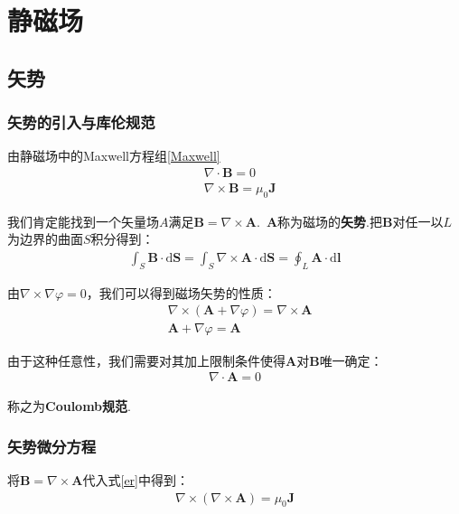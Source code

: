 \documentclass[main.tex]{subfiles}
\begin{document}
\chapter{静磁场}
\section{矢势}
\subsection{矢势的引入与库伦规范}
由静磁场中的Maxwell方程组\ref{Maxwell}
\begin{align}
    &\nabla \cdot \boldsymbol{B} = 0\\
    \label{er}&\nabla \times \boldsymbol{B} = \mu _0 \boldsymbol{J}
\end{align}

我们肯定能找到一个矢量场$A$满足$\boldsymbol{B} = \nabla \times \boldsymbol{A}$.\ $\boldsymbol{A}$称为磁场的\textbf{矢势}.把$\boldsymbol{B}$对任一以$L$为边界的曲面$S$积分得到：
\begin{align}
    \int_{S}^{} \boldsymbol{B} \cdot \mathrm{d} \boldsymbol{S} = \int_{S}^{} \nabla \times \boldsymbol{A} \cdot \mathrm{d} \boldsymbol{S} = \oint_{L}^{} \boldsymbol{A} \cdot \mathrm{d} \boldsymbol{l} 
\end{align}

由$\nabla \times \nabla \varphi = 0$，我们可以得到磁场矢势的性质：
\begin{align}
    &\nabla \times (\boldsymbol{A} + \nabla \varphi) = \nabla \times \boldsymbol{A}\\
    &\boldsymbol{A} + \nabla \varphi = \boldsymbol{A}
\end{align}

由于这种任意性，我们需要对其加上限制条件使得$\boldsymbol{A}$对$\boldsymbol{B}$唯一确定：
\begin{align}
    \nabla \cdot \boldsymbol{A} = 0
\end{align}

称之为\textbf{Coulomb规范}.

\subsection{矢势微分方程}
将$\boldsymbol{B} = \nabla \times \boldsymbol{A}$代入式\ref{er}中得到：
\begin{align}
    \nabla \times (\nabla \times \boldsymbol{A}) = \mu _0 \boldsymbol{J}
\end{align}
\end{document}

